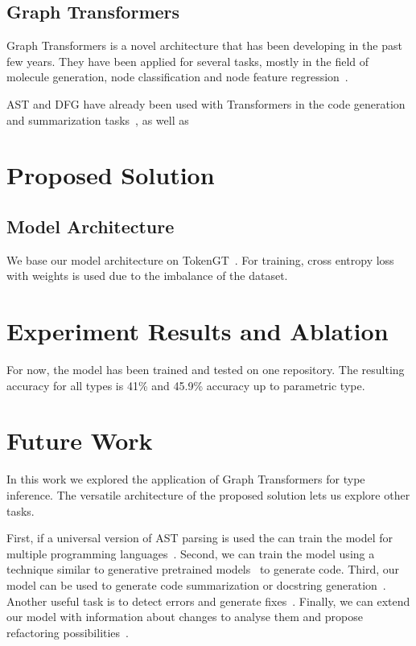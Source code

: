 \documentclass[sigplan,natbib=false]{acmart}
\begin{document}
\subsection{Graph Transformers}\label{subsec:graph-transformers}

Graph Transformers is a novel architecture that has been developing in the past few years.
They have been applied for several tasks, mostly in the field of molecule generation, node classification and node feature regression~\cite{kim_pure_2022,kreuzer_rethinking_2021,dwivedi_generalization_2021,ying_transformers_2021}.

AST and DFG have already been used with Transformers in the code generation and summarization tasks~\cite{wang_unified_2022,tang_ast-transformer_2021,sun_treegen_2020},
as well as

\section{Proposed Solution}\label{sec:proposed-solution}

\subsection{Model Architecture}\label{subsec:model-architecture}

We base our model architecture on TokenGT~\cite{kim_pure_2022}.
For training, cross entropy loss with weights is used due to the imbalance of the dataset.

\section{Experiment Results and Ablation}\label{sec:experiment-results-and-ablation}

For now, the model has been trained and tested on one repository.
The resulting accuracy for all types is 41\% and 45.9\% accuracy up to parametric type.

\section{Future Work}\label{sec:future-work}

In this work we explored the application of Graph Transformers for type inference.
The versatile architecture of the proposed solution lets us explore other tasks.

First, if a universal version of AST parsing is used the can train the model for multiple programming languages~\cite{wang_unified_2022}.
Second, we can train the model using a technique similar to generative pretrained models~\cite{radford_language_2019,brown_language_2020} to generate code.
Third, our model can be used to generate code summarization or docstring generation~\cite{barone_parallel_2017,liu_haconvgnn_2021}.
Another useful task is to detect errors and generate fixes~\cite{bhatia_automated_2016,fujimoto_addressing_2018,marginean_sapfix_2019}.
Finally, we can extend our model with information about changes to analyse them and propose refactoring possibilities~\cite{cabrera_lozoya_commit2vec_2021}.
\end{document}
